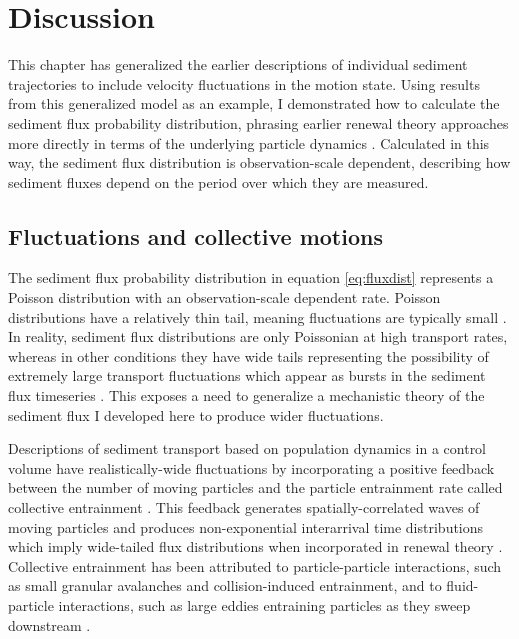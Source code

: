 \section{Discussion \label{sec:disc}}

This chapter has generalized the earlier descriptions of individual sediment trajectories \citep[e.g.][]{Lisle1998,Lajeunesse2018} to include velocity fluctuations in the motion state. Using results from this generalized model as an example, I demonstrated how to calculate the sediment flux probability distribution, phrasing earlier renewal theory approaches more directly in terms of the underlying particle dynamics \citep[e.g.][]{Turowski2010,Ancey2020}. 
Calculated in this way, the sediment flux distribution is observation-scale dependent, describing how sediment fluxes depend on the period over which they are measured.

\subsection{Fluctuations and collective motions}

The sediment flux probability distribution in equation \ref{eq:fluxdist} represents a Poisson distribution with an observation-scale dependent rate.
Poisson distributions have a relatively thin tail, meaning fluctuations are typically small \citep{Ancey2006}.
In reality, sediment flux distributions are only Poissonian at high transport rates, whereas in other conditions they have wide tails representing the possibility of extremely large transport fluctuations \citep{Ancey2008,Turowski2010,Dhont2010,Saletti2015} which appear as bursts \citep[e.g.][]{Goh2008} in the sediment flux timeseries \citep{Singh2009, Heyman2013,Benavides2021}. This exposes a need to generalize a mechanistic theory of the sediment flux I developed here to produce wider fluctuations.

Descriptions of sediment transport based on population dynamics in a control volume have realistically-wide fluctuations by incorporating a positive feedback between the number of moving particles and the particle entrainment rate called collective entrainment \citep{Ancey2008,Ancey2014}.
This feedback generates spatially-correlated waves of moving particles \citep{Ancey2014, Heyman2015} and produces non-exponential interarrival time distributions \citep{Heyman2013} which imply wide-tailed flux distributions when incorporated in renewal theory \citep{Turowski2010,Ancey2020}.
Collective entrainment has been attributed to particle-particle interactions, such as small granular avalanches and collision-induced entrainment, and to fluid-particle interactions, such as large eddies entraining particles as they sweep downstream \citep{Heyman2014b,Ancey2014,Lee2018}.

